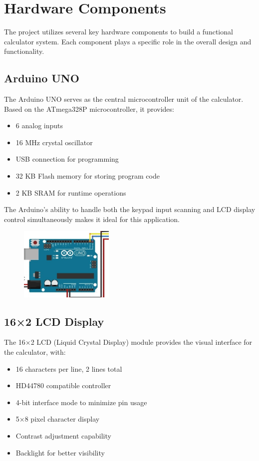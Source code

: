 \documentclass[12pt]{article}
\begin{document}
	\section{Hardware Components}
	The project utilizes several key hardware components to build a functional calculator system. Each component plays a specific role in the overall design and functionality.
	
	\subsection{Arduino UNO}
	The Arduino UNO serves as the central microcontroller unit of the calculator. Based on the ATmega328P microcontroller, it provides:
	\begin{itemize}
		\item 6 analog inputs
		\item 16 MHz crystal oscillator
		\item USB connection for programming
		\item 32 KB Flash memory for storing program code
		\item 2 KB SRAM for runtime operations
	\end{itemize}
	
	The Arduino's ability to handle both the keypad input scanning and LCD display control simultaneously makes it ideal for this application.
	\begin{figure}[h]
		\centering
		\includegraphics[width=0.4\textwidth]{figs/arduino}
	\end{figure}
	\subsection{16×2 LCD Display}
	The 16×2 LCD (Liquid Crystal Display) module provides the visual interface for the calculator, with:
	\begin{itemize}
		\item 16 characters per line, 2 lines total
		\item HD44780 compatible controller
		\item 4-bit interface mode to minimize pin usage
		\item 5×8 pixel character display
		\item Contrast adjustment capability
		\item Backlight for better visibility
	\end{itemize}
	
\end{document}
